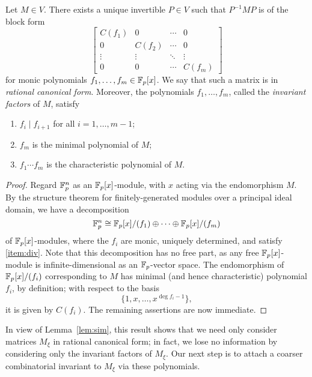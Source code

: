 \begin{thm}
\label{thm:rcf}
Let $M\in V$. There exists a unique invertible $P\in V$ such that $P^{-1}MP$ is of the block form
\begin{equation}
\label{eqn:rcf}
\begin{bmatrix}
C(f_1)&0&\cdots&0\\
0&C(f_2)&\cdots&0\\
\vdots&\vdots&\ddots&\vdots\\
0&0&\cdots&C(f_m)
\end{bmatrix}
\end{equation}
for monic polynomials $f_1,\ldots,f_m\in\mathbb{F}_p[x]$. We say that such a matrix is in \emph{rational canonical form}. Moreover, the polynomials $f_1,\ldots,f_m$, called the \emph{invariant factors} of $M$, satisfy
\begin{enumerate}
\item $f_i\mid f_{i+1}$ for all $i=1,\ldots,m-1$;\label{item:div}
\item $f_m$ is the minimal polynomial of $M$;\label{item:min}
\item $f_1\cdots f_m$ is the characteristic polynomial of $M$.\label{item:char}
\end{enumerate}
\end{thm}
\begin{proof}
Regard $\mathbb{F}_p^n$ as an $\mathbb{F}_p[x]$-module, with $x$ acting via the endomorphism $M$. By the structure theorem for finitely-generated modules over a principal ideal domain, we have a decomposition
\begin{equation*}
\mathbb{F}_p^n\cong\mathbb{F}_p[x]/(f_1)\oplus\cdots\oplus\mathbb{F}_p[x]/(f_m)
\end{equation*}
of $\mathbb{F}_p[x]$-modules, where the $f_i$ are monic, uniquely determined, and satisfy \eqref{item:div}. Note that this decomposition has no free part, as any free $\mathbb{F}_p[x]$-module is infinite-dimensional as an $\mathbb{F}_p$-vector space. The endomorphism of $\mathbb{F}_p[x]/(f_i)$ corresponding to $M$ has minimal (and hence characteristic) polynomial $f_i$, by definition; with respect to the basis
\begin{equation*}
\{1,x,\ldots,x^{\deg f_i-1}\},
\end{equation*}
it is given by $C(f_i)$. The remaining assertions are now immediate.
\end{proof}
In view of Lemma~\ref{lem:sim}, this result shows that we need only consider matrices $M_\xi$ in rational canonical form; in fact, we lose no information by considering only the invariant factors of $M_\xi$. Our next step is to attach a coarser combinatorial invariant to $M_\xi$ via these polynomials.
